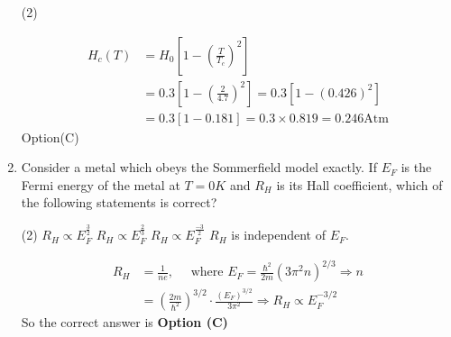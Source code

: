 \begin{enumerate}
{}
\begin{tasks}(2)
\end{tasks}
\begin{answer}
\begin{align*}
H_{c}(T)&=H_{0}\left[1-\left(\frac{T}{T_{c}}\right)^{2}\right]\\&=0.3\left[1-\left(\frac{2}{4.7}\right)^{2}\right]=0.3\left[1-(0.426)^{2}\right]\\
&=0.3[1-0.181]=0.3 \times 0.819=0.246 \mathrm{Atm}
\end{align*}
Option(C)
\end{answer}
	\item Consider a metal which obeys the Sommerfield model exactly. If $E_{F}$ is the Fermi energy of the metal at $T=0 K$ and $R_{H}$ is its Hall coefficient, which of the following statements is correct?
{}

\begin{tasks}(2)
\task[\textbf{A.}] $R_{H} \propto E_{F}^{\frac{3}{2}}$
\task[\textbf{B.}] $R_{H} \propto E_{F}^{\frac{2}{3}}$
\task[\textbf{C.}] $R_{H} \propto E_{F}^{\frac{-3}{2}}$
\task[\textbf{D.}] $R_{H}$ is independent of $E_{F}$.
\end{tasks}
\begin{answer}
\begin{align*}
R_{H}&=\frac{1}{n e}, \quad\text{ where }E_{F}=\frac{\hbar^{2}}{2 m}\left(3 \pi^{2} n\right)^{2 / 3} \Rightarrow n\\&=\left(\frac{2 m}{\hbar^{2}}\right)^{3 / 2} \cdot \frac{\left(E_{F}\right)^{3 / 2}}{3 \pi^{2}} \Rightarrow R_{H} \propto E_{F}^{-3 / 2}
\end{align*}
So the correct answer is \textbf{Option (C)}
\end{answer}
\end{enumerate}